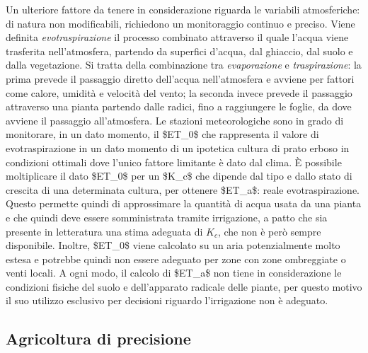\documentclass[12pt,a4paper,openright,twoside]{book}
\begin{document}
Un ulteriore fattore da tenere in considerazione riguarda le variabili atmosferiche: di natura non modificabili, richiedono un monitoraggio continuo e preciso. Viene definita \textit{evotraspirazione} il processo combinato attraverso il quale l'acqua viene trasferita nell'atmosfera, partendo da superfici d'acqua, dal ghiaccio, dal suolo e dalla vegetazione. Si tratta della combinazione tra \textit{evaporazione} e \textit{traspirazione}: la prima prevede il passaggio diretto dell'acqua nell'atmosfera e avviene per fattori come calore, umidità e velocità del vento; la seconda invece prevede il passaggio attraverso una pianta partendo dalle radici, fino a raggiungere le foglie, da dove avviene il passaggio all'atmosfera.
Le stazioni meteorologiche sono in grado di monitorare, in un dato momento, il \ac{$ET_0$} che rappresenta il valore di evotraspirazione in un dato momento di un ipotetica cultura di prato erboso in condizioni ottimali dove l'unico fattore limitante è dato dal clima. È possibile moltiplicare il dato \ac{$ET_0$} per un \ac{$K_c$} che dipende dal tipo e dallo stato di crescita di una determinata cultura, per ottenere \ac{$ET_a$}: reale evotraspirazione.
Questo permette quindi di approssimare la quantità di acqua usata da una pianta e che quindi deve essere somministrata tramite irrigazione, a patto che sia presente in letteratura una stima adeguata di $K_c$, che non è però sempre disponibile. Inoltre, \ac{$ET_0$} viene calcolato su un aria potenzialmente molto estesa e potrebbe quindi non essere adeguato per zone con zone ombreggiate o venti locali.
A ogni modo, il calcolo di \ac{$ET_a$} non tiene in considerazione le condizioni fisiche del suolo e dell'apparato radicale delle piante, per questo motivo il suo utilizzo esclusivo per decisioni riguardo l'irrigazione non è adeguato.

\subsection{Agricoltura di precisione}
\end{document}
